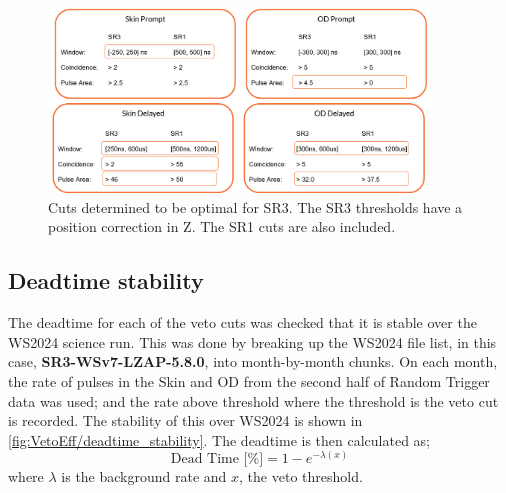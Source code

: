 \begin{figure}
	\centering
	\includegraphics[width=0.9\textwidth]{figures/VetoEfficiency/sr3_cuts.png}
	\caption{Cuts determined to be optimal for SR3.
		The SR3 thresholds have a position correction in Z. The SR1 cuts are also included.}
	\label{fig:VetoEff/sr3_veto_cuts}
\end{figure}

\subsection{Deadtime stability}
The deadtime for each of the veto cuts was checked that it is stable over the WS2024 science run.
This was done by breaking up the WS2024 file list, in this case, \textbf{SR3-WSv7-LZAP-5.8.0}, into month-by-month chunks.
On each month, the rate of pulses in the Skin and OD from the second half of Random Trigger data was used; and the rate above threshold where the threshold is the veto cut is recorded. 
The stability of this over WS2024 is shown in \autoref{fig:VetoEff/deadtime_stability}.
The deadtime is then calculated as;
\begin{equation}
	\textrm{Dead Time [\%]} = 1 - e^{-\lambda (x)}
\end{equation}
where $\lambda$ is the background rate and $x$, the veto threshold.

